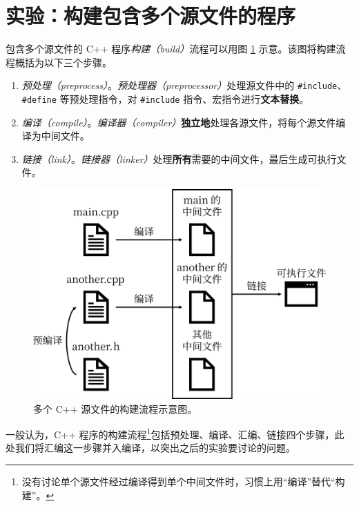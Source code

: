 
\section{实验：构建包含多个源文件的程序}

包含多个源文件的 C++ 程序\emph{构建（build）}流程可以用图 \ref{fig:build-flow} 示意。该图将构建流程概括为以下三个步骤。

\begin{enumerate}
	\item \emph{预处理（preprocess）}。\emph{预处理器（preprocessor）}处理源文件中的 \lstinline[language={[17]C++}]{#include}、\lstinline[language={[17]C++}]{#define} 等预处理指令，对 \lstinline[language={[17]C++}]{#include} 指令、宏指令进行\textbf{文本替换}。
	\item \emph{编译（compile）}。\emph{编译器（compiler）}\textbf{独立地}处理各源文件，将每个源文件编译为中间文件。
	\item \emph{链接（link）}。\emph{链接器（linker）}处理\textbf{所有}需要的中间文件，最后生成可执行文件。
\end{enumerate}

\begin{figure}
	\centering
	\includegraphics[scale=0.15]{assets/build-flow}
	\caption{多个 C++ 源文件的构建流程示意图。}
	\label{fig:build-flow}
\end{figure}

一般认为，C++ 程序的构建流程\footnote{没有讨论单个源文件经过编译得到单个中间文件时，习惯上用“编译”替代“构建”。}包括预处理、编译、汇编、链接四个步骤，此处我们将汇编这一步骤并入编译，以突出之后的实验要讨论的问题。

